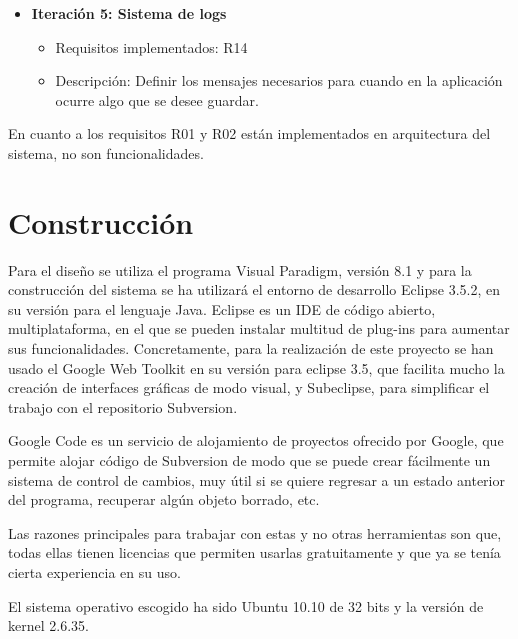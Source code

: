 \begin{itemize}
    \item {\bfseries Iteración 5: Sistema de logs}
    \begin{itemize}
        \item Requisitos implementados: R14
        \item Descripción: Definir los mensajes necesarios para cuando en la aplicación ocurre algo que se desee guardar.
    \end{itemize}
\end{itemize}


En cuanto a los requisitos R01 y R02 están implementados en arquitectura del sistema, no son funcionalidades.
\newline


\section{Construcción}
\label{sec:planificacion:construccion}

Para el diseño se utiliza el programa Visual Paradigm, versión 8.1 y para la construcción del sistema se ha utilizará el entorno de desarrollo Eclipse 3.5.2\cite{eclipse:2005}, en su versión para el lenguaje Java\cite{java:2005}.
Eclipse es un IDE de código abierto, multiplataforma, en el que se pueden instalar multitud de plug-ins para aumentar sus funcionalidades. Concretamente, para la realización de este proyecto se han usado el Google Web Toolkit en su versión para eclipse 3.5, que facilita mucho la creación de interfaces gráficas de modo visual, y Subeclipse, para simplificar el trabajo con el repositorio Subversion\cite{subversion:2008}.
\newline

Google Code es un servicio de alojamiento de proyectos ofrecido por Google, que permite alojar código de Subversion de modo que se puede crear fácilmente un sistema de control de cambios, muy útil si se quiere regresar a un estado anterior del programa, recuperar algún objeto borrado, etc.
\newline

Las razones principales para trabajar con estas y no otras herramientas son que, todas ellas tienen licencias que permiten usarlas gratuitamente y que ya se tenía cierta experiencia en su uso.
\newline

El sistema operativo escogido ha sido Ubuntu 10.10\cite{ubuntu:2011} de 32 bits y la versión de kernel 2.6.35.
\newline


